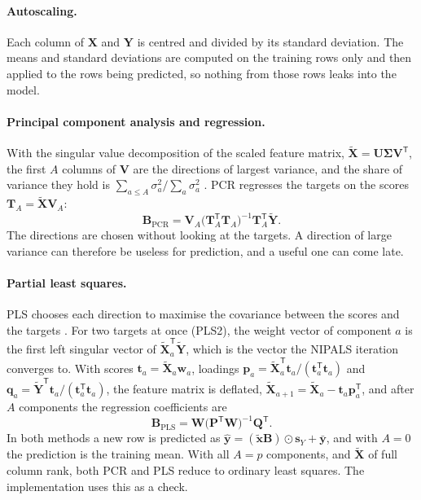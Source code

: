 \documentclass[11pt,a4paper]{article}
\newcommand{\vect}[1]{\boldsymbol{#1}}
\begin{document}
\paragraph{Autoscaling.}
Each column of $\vect X$ and $\vect Y$ is centred and divided by its standard deviation. The
means and standard deviations are computed on the training rows only and then applied to the
rows being predicted, so nothing from those rows leaks into the model.

\paragraph{Principal component analysis and regression.}
With the singular value decomposition of the scaled feature matrix,
$\tilde{\vect X} = \vect U \vect\Sigma \vect V^{\mathsf T}$, the first $A$ columns of
$\vect V$ are the directions of largest variance, and the share of variance they hold is
$\sum_{a \le A}\sigma_a^2 / \sum_a \sigma_a^2$ \citep{jolliffe2002}. PCR regresses the
targets on the scores $\vect T_A = \tilde{\vect X}\vect V_A$:
\begin{equation}
  \vect B_{\text{PCR}} = \vect V_A \big(\vect T_A^{\mathsf T}\vect T_A\big)^{-1}
                         \vect T_A^{\mathsf T}\tilde{\vect Y}.
\end{equation}
The directions are chosen without looking at the targets. A direction of large variance can
therefore be useless for prediction, and a useful one can come late.

\paragraph{Partial least squares.}
PLS chooses each direction to maximise the covariance between the scores and the targets
\citep{wold2001,hastie2009}. For two targets at once (PLS2), the weight vector of component
$a$ is the first left singular vector of $\tilde{\vect X}_a^{\mathsf T}\tilde{\vect Y}$, which
is the vector the NIPALS iteration converges to. With scores $\vect t_a = \tilde{\vect X}_a
\vect w_a$, loadings $\vect p_a = \tilde{\vect X}_a^{\mathsf T}\vect t_a / (\vect t_a^{\mathsf T}
\vect t_a)$ and $\vect q_a = \tilde{\vect Y}^{\mathsf T}\vect t_a / (\vect t_a^{\mathsf T}
\vect t_a)$, the feature matrix is deflated, $\tilde{\vect X}_{a+1} = \tilde{\vect X}_a - \vect
t_a \vect p_a^{\mathsf T}$, and after $A$ components the regression coefficients are
\begin{equation}
  \vect B_{\text{PLS}} = \vect W \big(\vect P^{\mathsf T}\vect W\big)^{-1} \vect Q^{\mathsf T}.
\end{equation}
In both methods a new row is predicted as
$\hat{\vect y} = (\tilde{\vect x}\vect B) \odot \vect s_Y + \bar{\vect y}$, and with $A = 0$
the prediction is the training mean. With all $A = p$ components, and $\tilde{\vect X}$ of full
column rank, both PCR and PLS reduce to ordinary least squares. The implementation uses this as a check.
\end{document}
